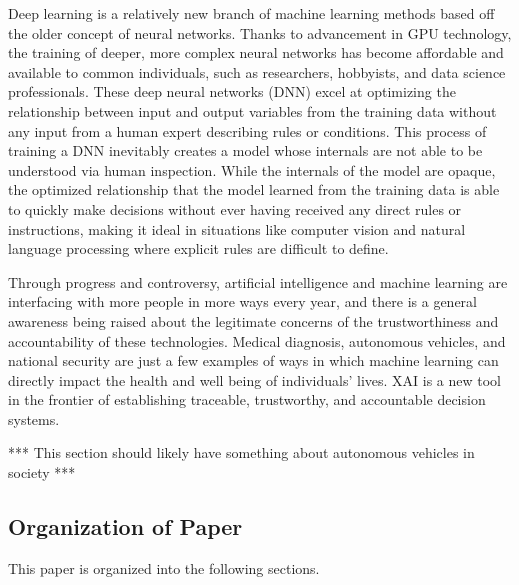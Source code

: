 Deep learning is a relatively new branch of machine learning methods based off the older concept of neural networks.  Thanks to advancement in GPU technology, the training of deeper, more complex neural networks has become affordable and available to common individuals, such as researchers, hobbyists, and data science professionals.  These deep neural networks (DNN) excel at optimizing the relationship between input and output variables from the training data without any input from a human expert describing rules or conditions.  This process of training a DNN inevitably creates a model whose internals are not able to be  understood via human inspection.  While the internals of the model are opaque, the optimized relationship that the model learned from the training data is able to quickly make decisions without ever having received any direct rules or instructions, making it ideal in situations like computer vision and natural language processing where explicit rules are difficult to define.

Through progress and controversy, artificial intelligence and machine learning are interfacing with more people in more ways every year, and there is a general awareness being raised about the legitimate concerns of the trustworthiness and accountability of these technologies.  Medical diagnosis, autonomous vehicles, and national security are just a few examples of ways in which machine learning can directly impact the health and well being of individuals' lives.  XAI is a new tool in the frontier of establishing traceable, trustworthy, and accountable decision systems.

*** This section should likely have something about autonomous vehicles in society ***

\subsection{Organization of Paper}

This paper is organized into the following sections.

